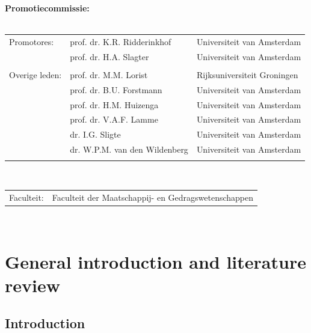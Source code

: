 \documentclass[12pt,a4paper,oldfontcommands]{memoir}
\begin{document}
{%
\clearpage
\noindent%
{\bf Promotiecommissie:}\\
\\
\begin{tabular}[t]{@{}p{2.75cm}ll}
Promotores:    & prof. dr. K.R. Ridderinkhof    & Universiteit van Amsterdam \\  %
               & prof. dr. H.A. Slagter         & Universiteit van Amsterdam \\  %
\\
Overige leden: & prof. dr. M.M. Lorist          & Rijksuniversiteit Groningen \\ %
               & prof. dr. B.U. Forstmann       & Universiteit van Amsterdam \\  %
               & prof. dr. H.M. Huizenga        & Universiteit van Amsterdam \\  %
               & prof. dr. V.A.F. Lamme         & Universiteit van Amsterdam \\  %
               & dr. I.G. Sligte                & Universiteit van Amsterdam \\  %
               & dr. W.P.M. van den Wildenberg  & Universiteit van Amsterdam \\  %
\\               
\end{tabular}\\

\noindent%
\begin{tabular}[t]{@{}p{2.75cm}l}
Faculteit:     & Faculteit der Maatschappij- en Gedragswetenschappen \\ %
\end{tabular}\\

\clearpage
} %

{
\hypersetup{linkcolor=black}
\setcounter{tocdepth}{1}
\tableofcontents
}
\hypertarget{part-intro}{%
\part{General introduction and literature review}\label{part-intro}}

\hypertarget{intro-general}{%
\chapter{Introduction}\label{intro-general}}
\end{document}
